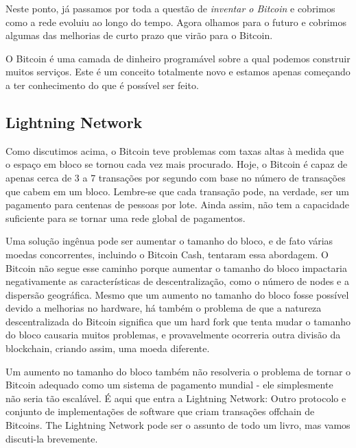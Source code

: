 Neste ponto, já passamos por toda a questão de \textit{inventar o Bitcoin} e cobrimos como a rede evoluiu ao longo do tempo. Agora olhamos para o futuro e cobrimos algumas das melhorias de curto prazo que virão para o Bitcoin.

%
O Bitcoin é uma camada de dinheiro programável sobre a qual podemos construir muitos serviços.
Este é um conceito totalmente novo e estamos apenas começando a ter conhecimento do que é possível ser feito.

\subsection*{Lightning Network}

Como discutimos acima, o Bitcoin teve problemas com taxas altas à medida que o espaço em bloco se tornou cada vez mais procurado.
Hoje, o Bitcoin é capaz de apenas cerca de 3 a 7 transações por segundo com base no número de transações que cabem em um bloco.
Lembre-se que cada transação pode, na verdade, ser um pagamento para centenas de pessoas por lote. 
Ainda assim, não tem a capacidade suficiente para se tornar uma rede global de pagamentos.

Uma solução ingênua pode ser aumentar o tamanho do bloco, e de fato várias moedas concorrentes, incluindo o Bitcoin Cash, tentaram essa abordagem.
O Bitcoin não segue esse caminho porque aumentar o tamanho do bloco impactaria negativamente as características de descentralização, como o número de nodes e a dispersão geográfica.
Mesmo que um aumento no tamanho do bloco fosse possível devido a melhorias no hardware, há também o problema de que a natureza descentralizada do Bitcoin significa que um hard fork que tenta mudar o tamanho do bloco causaria muitos problemas, e provavelmente ocorreria outra divisão da blockchain, criando assim, uma moeda diferente.

Um aumento no tamanho do bloco também não resolveria o problema de tornar o Bitcoin adequado como um sistema de pagamento mundial - ele simplesmente não seria tão escalável. É aqui que entra a Lightning Network: Outro protocolo e conjunto de implementações de software que criam transações offchain de Bitcoins.
The Lightning Network pode ser o assunto de todo um livro, mas vamos discuti-la brevemente.

